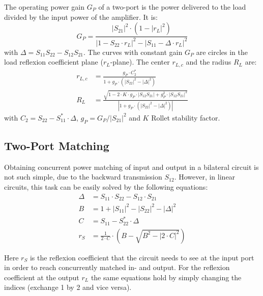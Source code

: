\addvspace{12pt}

The operating power gain $G_P$ of a two-port is the power delivered
to the load divided by the input power of the amplifier. It is:
\begin{equation}
G_P = \frac{|S_{21}|^2\cdot (1-|r_L|^2)}{|1-S_{22}\cdot r_L|^2 - |S_{11}-\Delta\cdot r_L|^2}
\end{equation}
with $\Delta = S_{11}S_{22} - S_{12}S_{21}$. The curves with constant
gain $G_P$ are circles in the load reflexion coefficient plane ($r_L$-plane).
The center $r_{L,c}$ and the radius $R_L$ are:
\begin{align}
r_{L,c} & = \frac{g_P\cdot C_2^*}{1 + g_P\cdot(|S_{22}|^2 - |\Delta|^2)} \\
R_L     & = \frac{\sqrt{1 - 2\cdot K\cdot g_P\cdot|S_{12}S_{21}| + g_P^2\cdot|S_{12}S_{21}|^2}}
                 {|1 + g_P\cdot(|S_{22}|^2 - |\Delta|^2)|}
\end{align}
with $C_2 = S_{22} - S_{11}^*\cdot\Delta$, $g_P = G_P / |S_{21}|^2$ and $K$ Rollet stability factor.

\subsection{Two-Port Matching}

Obtaining concurrent power matching of input and output in a bilateral
circuit is not such simple, due to the backward transmission $S_{12}$.
However, in linear circuits, this task can be easily solved by the
following equations:
\begin{align}
\Delta & = S_{11}\cdot S_{22} - S_{12}\cdot S_{21} \\
B      & = 1 + |S_{11}|^2 - |S_{22}|^2 - |\Delta|^2 \\
C      & = S_{11} - S_{22}^* \cdot \Delta \\
r_S    & = \frac{1}{2\cdot C} \cdot \left( B - \sqrt{B^2 - |2\cdot C|^2 } \right)
\end{align}

Here $r_S$ is the reflexion coefficient that the circuit needs to see
at the input port in order to reach concurrently matched in- and
output.  For the reflexion coefficient at the output $r_L$ the same
equations hold by simply changing the indices (exchange 1 by 2 and
vice versa).
